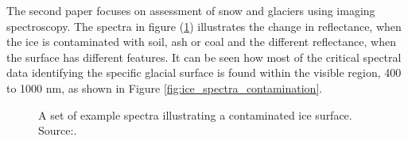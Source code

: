 The second paper focuses on assessment of snow and glaciers using imaging spectroscopy\cite{negi2015a}. The spectra in figure (\ref{fig:ice_assessment_spectra2}) illustrates the change in reflectance, when the ice is contaminated with soil, ash or coal and the different reflectance, when the surface has different features. It can be seen how most of the critical spectral data identifying the specific glacial surface is found within the visible region, 400 to 1000 nm, as shown in Figure \ref{fig:ice_spectra_contamination}.
\begin{figure}[htb!]
    \centering
    \captionsetup[subfigure]{width=0.45\textwidth}
    \caption{A set of example spectra illustrating a contaminated ice surface. Source:\cite{negi2015a}.}\label{fig:ice_assessment_spectra2}
\end{figure}

